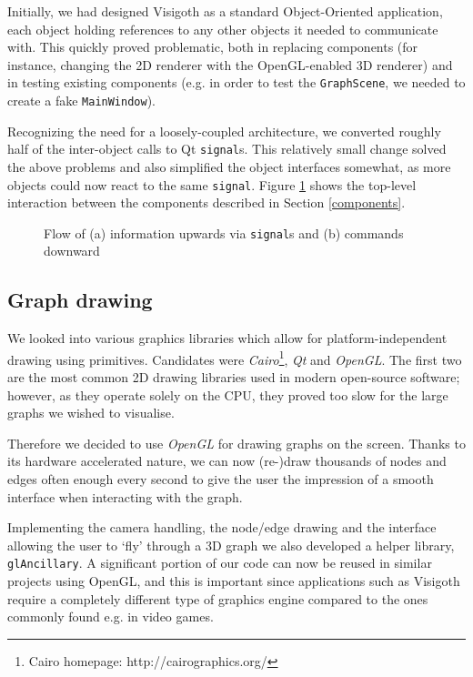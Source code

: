 \documentclass[a4paper,11pt,titlepage]{article}
\newcommand{\code}[1]{\texttt{#1}}
\newcommand{\buzz}[1]{\emph{#1}}
\begin{document}
Initially, we had designed Visigoth as a standard Object-Oriented
application, each object holding references to any other objects it
needed to communicate with. This quickly proved problematic, both in
replacing components (for instance, changing the 2D renderer with the
OpenGL-enabled 3D renderer) and in testing existing components
(e.g. in order to test the \code{GraphScene}, we needed to create a
fake \code{MainWindow}).

Recognizing the need for a loosely-coupled architecture, we converted
roughly half of the inter-object calls to Qt \code{signal}s. This
relatively small change solved the above problems and also simplified
the object interfaces somewhat, as more objects could now react to the
same \code{signal}. Figure \ref{fig:interaction} shows the top-level
interaction between the components described in Section
\ref{components}.

\begin{figure}[ht]
  \centering
  
  \caption{Flow of (a) information upwards via \code{signal}s and (b)
    commands downward}
  \label{fig:interaction}
\end{figure}

\subsection{Graph drawing}

We looked into various graphics libraries which allow for
platform-independent drawing using primitives. Candidates were
\buzz{Cairo}\footnote{Cairo homepage: http://cairographics.org/},
\buzz{Qt} and \buzz{OpenGL}. The first two are the
most common 2D drawing libraries used in modern open-source
software; however, as they operate solely on the CPU, they proved
too slow for the large graphs we wished to visualise.

Therefore we decided to use \buzz{OpenGL} for drawing graphs on
the screen. Thanks to its hardware accelerated nature, we can now
(re-)draw thousands of nodes and edges often enough every second
to give the user the impression of a smooth interface when interacting
with the graph.

Implementing the camera handling, the node/edge drawing and the
interface allowing the user to `fly' through a 3D graph we also
developed a helper library, \code{glAncillary}. A significant portion
of our code can now be reused in similar projects using OpenGL,
and this is important since applications such as Visigoth require a
completely different type of graphics engine compared to the ones
commonly found e.g. in video games.
\end{document}
